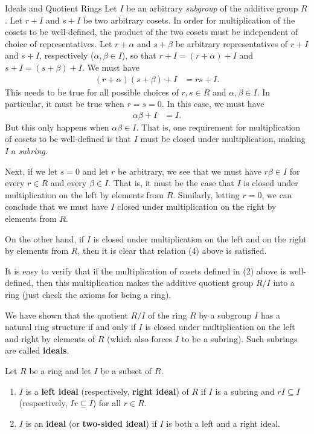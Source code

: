 \begin{section}{Ideals and Quotient Rings}
Let $I$ be an arbitrary \emph{subgroup} of the additive group $R$.  Let $r+I$ and $s+I$ be two arbitrary cosets.  In order for multiplication of the cosets to be well-defined, the product of the two cosets must be independent of choice of representatives.  Let $r+\alpha$ and $s+\beta$ be arbitrary representatives of $r+I$ and $s+I$, respectively ($\alpha,\beta\in I$), so that $r+I=(r+\alpha)+I$ and $s+I=(s+\beta)+I$.  We must have
\begin{align}
(r+\alpha)(s+\beta)+I & =rs+I.
\end{align}
This needs to be true for all possible choices of $r,s\in R$ and $\alpha, \beta\in I$.  In particular, it must be true when $r=s=0$.  In this case, we must have
\begin{align}
\alpha\beta+I & =I.
\end{align}
But this only happens when $\alpha\beta\in I$.  That is, one requirement for multiplication of cosets to be well-defined is that $I$ must be closed under multiplication, making $I$ a \emph{subring}.

Next, if we let $s=0$ and let $r$ be arbitrary, we see that we must have $r\beta\in I$ for every $r\in R$ and every $\beta\in I$.  That is, it must be the case that $I$ is closed under multiplication on the left by elements from $R$.  Similarly, letting $r=0$, we can conclude that we must have $I$ closed under multiplication on the right by elements from $R$.  

On the other hand, if $I$ is closed under multiplication on the left and on the right by elements from $R$, then it is clear that relation (4) above is satisfied.

It is easy to verify that if the multiplication of cosets defined in (2) above is well-defined, then this multiplication makes the additive quotient group $R/I$ into a ring (just check the axioms for being a ring).

We have shown that the quotient $R/I$ of the ring $R$ by a subgroup $I$ has a natural ring structure if and only if $I$ is closed under multiplication on the left and right by elements of $R$ (which also forces $I$ to be a subring).  Such subrings are called \textbf{ideals}.

\begin{definition}
Let $R$ be a ring and let $I$ be a subset of $R$.
\begin{enumerate}[label=\textrm{(\alph*)}]
\item $I$ is a \textbf{left ideal} (respectively, \textbf{right ideal}) of $R$ if $I$ is a subring and $rI\subseteq I$ (respectively, $Ir\subseteq I$) for all $r\in R$.
\item $I$ is an \textbf{ideal} (or \textbf{two-sided ideal}) if $I$ is both a left and a right ideal.
\end{enumerate}
\end{definition}


\end{section}
